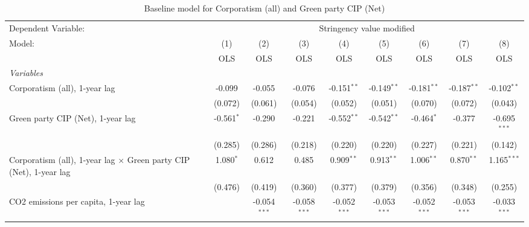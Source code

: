 
\begin{table}[htbp]
   \caption{Baseline model for Corporatism (all) and Green party CIP (Net)}
   \centering
   \begin{tabular}{lcccccccc}
      \toprule
      Dependent Variable: & \multicolumn{8}{c}{Stringency value modified}\\
      Model:                                                                    & (1)          & (2)            & (3)            & (4)            & (5)            & (6)            & (7)            & (8)\\  
                                                                                &  OLS         & OLS            & OLS            & OLS            & OLS            & OLS            & OLS            & OLS\\  
      \midrule
      \emph{Variables}\\
      Corporatism (all), 1-year lag                                             & -0.099       & -0.055         & -0.076         & -0.151$^{**}$  & -0.149$^{**}$  & -0.181$^{**}$  & -0.187$^{**}$  & -0.102$^{**}$\\   
                                                                                & (0.072)      & (0.061)        & (0.054)        & (0.052)        & (0.051)        & (0.070)        & (0.072)        & (0.043)\\   
      Green party CIP (Net), 1-year lag                                         & -0.561$^{*}$ & -0.290         & -0.221         & -0.552$^{**}$  & -0.542$^{**}$  & -0.464$^{*}$   & -0.377         & -0.695$^{***}$\\   
                                                                                & (0.285)      & (0.286)        & (0.218)        & (0.220)        & (0.220)        & (0.227)        & (0.221)        & (0.142)\\   
      Corporatism (all), 1-year lag $\times$ Green party CIP (Net), 1-year lag  & 1.080$^{*}$  & 0.612          & 0.485          & 0.909$^{**}$   & 0.913$^{**}$   & 1.006$^{**}$   & 0.870$^{**}$   & 1.165$^{***}$\\   
                                                                                & (0.476)      & (0.419)        & (0.360)        & (0.377)        & (0.379)        & (0.356)        & (0.348)        & (0.255)\\   
      CO2 emissions per capita, 1-year lag                                      &              & -0.054$^{***}$ & -0.058$^{***}$ & -0.052$^{***}$ & -0.053$^{***}$ & -0.052$^{***}$ & -0.053$^{***}$ & -0.033$^{***}$\\   

\end{tabular}
\end{table}
